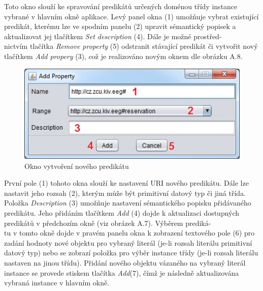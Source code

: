 \documentclass{projekt}
\begin{document}
\thispagestyle{plain}

Toto okno slouží ke spravování predikátů určených doménou třídy instance vybrané v hlavním okně aplikace. Levý panel okna (1) umožňuje vybrat existující predikát, kterému lze ve spodním panelu (2) upravit sémantický popisek a aktualizovat jej tlačítkem {\it Set description} (4). Dále je možné prostřed-\\nictvím tlačítka {\it Remove property} (5) odstranit stávající predikát či vytvořit nový tlačítkem {\it Add propery} (3), což je realizováno novým oknem dle obrázku A.8.


\begin{figure}[htb!]
\begin{center}
\includegraphics[scale=0.72]{manualTestAddProperty.jpg}
\caption{Okno vytvoření nového predikátu}
\end{center}
\end{figure}


První pole (1) tohoto okna slouží ke nastavení URI nového predikátu. Dále lze nastavit jeho rozsah (2), kterým může být primitivní datový typ či jiná třída. Položka {\it Description} (3) umožňuje nastavení sémantického popisku přidávaného predikátu. Jeho přidáním tlačítkem {\it Add} (4) dojde k aktualizaci dostupných predikátů v předchozím okně (viz obrázek A.7). Výběrem prediká-\\tu v tomto okně dojde v pravém panelu okna k zobrazení textového pole (6) pro zadání hodnoty nové objektu pro vybraný literál (je-li rozsah literálu primitivní datový typ) nebo se zobrazí položka pro výběr instance třídy (je-li rozsah literálu nastaven na jinou třídu). Přidání nového objektu vázaného na vybraný literál instance se provede stiskem tlačítka {\it Add}(7), čímž je následně aktualizována vybraná instance v hlavním okně.

\thispagestyle{plain}


\newpage
\thispagestyle{plain}
\end{document}

